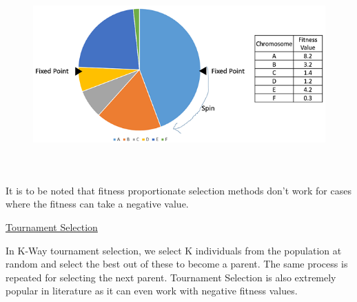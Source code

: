 \documentclass[12pt]{article}
\renewcommand{\_}{\kern-1.5pt\textunderscore\kern-1.5pt}
\begin{document}
\begin{enumerate}

\begin{figure}[H]
	\begin{Center}
		\includegraphics[width=6.25in,height=2.93in]{./media/image9.png}
	\end{Center}
\end{figure}



\setlength{\parskip}{0.0pt}
\par

\setlength{\parskip}{7.2pt}
\begin{adjustwidth}{0.03in}{0.03in}
\begin{justify}
It is to be noted that fitness proportionate selection methods don’t work for cases where the fitness can take a negative value.
\end{justify}\par

\end{adjustwidth}


\vspace{\baselineskip}
\begin{adjustwidth}{0.03in}{0.03in}
\begin{justify}
{\fontsize{14pt}{16.8pt}\selectfont \uline{Tournament Selection}\par}
\end{justify}\par

\end{adjustwidth}

\begin{adjustwidth}{0.03in}{0.03in}
{\fontsize{11pt}{13.2pt}\selectfont In K-Way tournament selection, we select K individuals from the population at random and select the best out of these to become a parent. The same process is repeated for selecting the next parent. Tournament Selection is also extremely popular in literature as it can even work with negative fitness values.\par}\par


\end{adjustwidth}
\end{enumerate}
\end{document}
